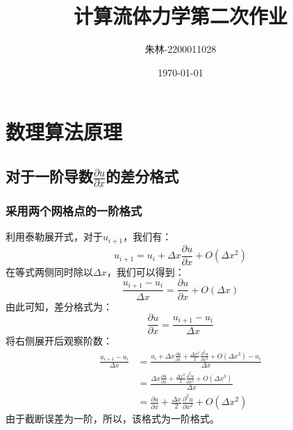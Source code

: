 \documentclass[UTF8]{ctexart}
\begin{document}
\title{计算流体力学第二次作业}
\author{朱林-2200011028}
\date{\today}
\maketitle

\section{数理算法原理}

\subsection{对于一阶导数$\frac{\partial u}{\partial x}$的差分格式}

\subsubsection{采用两个网格点的一阶格式}
利用泰勒展开式，对于$u_{i+1}$，我们有：
\begin{equation}
    u_{i+1} = u_i + \Delta x \frac{\partial u}{\partial x} + O(\Delta x^2)
\end{equation}
在等式两侧同时除以$\Delta x$，我们可以得到：
\begin{equation}
    \frac{u_{i+1} - u_i}{\Delta x} = \frac{\partial u}{\partial x} + O(\Delta x)
\end{equation}
由此可知，差分格式为：
\begin{equation}
    \frac{\partial u}{\partial x} = \frac{u_{i+1} - u_i}{\Delta x} 
\end{equation}
将右侧展开后观察阶数：
\begin{equation}
    \begin{aligned}
        \frac{u_{i+1} - u_i}{\Delta x} &= \frac{u_i + \Delta x \frac{\partial u}{\partial x} +  \frac{\Delta x^2}{2} \frac{\partial^2 u}{\partial x^2} + O(\Delta x^3) - u_i}{\Delta x} \\
        &= \frac{\Delta x \frac{\partial u}{\partial x} +  \frac{\Delta x^2}{2} \frac{\partial^2 u}{\partial x^2} + O(\Delta x^3)}{\Delta x} \\
        &= \frac{\partial u}{\partial x} + \frac{\Delta x}{2} \frac{\partial^2 u}{\partial x^2} + O(\Delta x^2)
    \end{aligned}
\end{equation}
由于截断误差为一阶，所以，该格式为一阶格式。
\end{document}
